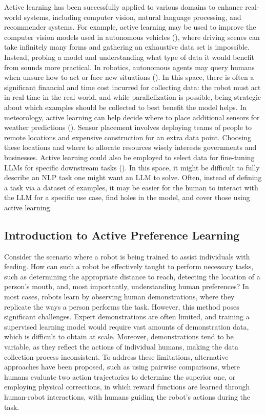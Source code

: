 \documentclass[
  letterpaper,
  numbers=noenddot,
  DIV=11,
  oneside]{scrreprt}
\theoremstyle{remark}
\begin{document}
Active learning has been successfully applied to various domains to
enhance real-world systems, including computer vision, natural language
processing, and recommender systems. For example, active learning may be
used to improve the computer vision models used in autonomous vehicles
(), where driving
scenes can take infinitely many forms and gathering an exhaustive data
set is impossible. Instead, probing a model and understanding what type
of data it would benefit from sounds more practical. In robotics,
autonomous agents may query humans when unsure how to act or face new
situations (). In this space, there is often a significant financial and time
cost incurred for collecting data: the robot must act in real-time in
the real world, and while parallelization is possible, being strategic
about which examples should be collected to best benefit the model
helps. In meteorology, active learning can help decide where to place
additional sensors for weather predictions
().
Sensor placement involves deploying teams of people to remote locations
and expensive construction for an extra data point. Choosing these
locations and where to allocate resources wisely interests governments
and businesses. Active learning could also be employed to select data
for fine-tuning LLMs for specific downstream tasks
(). In this space, it
might be difficult to fully describe an NLP task one might want an LLM
to solve. Often, instead of defining a task via a dataset of examples,
it may be easier for the human to interact with the LLM for a specific
use case, find holes in the model, and cover those using active
learning.

\subsection{Introduction to Active Preference
Learning}\label{introduction-to-active-preference-learning}

Consider the scenario where a robot is being trained to assist
individuals with feeding. How can such a robot be effectively taught to
perform necessary tasks, such as determining the appropriate distance to
reach, detecting the location of a person's mouth, and, most
importantly, understanding human preferences? In most cases, robots
learn by observing human demonstrations, where they replicate the ways a
person performs the task. However, this method poses significant
challenges. Expert demonstrations are often limited, and training a
supervised learning model would require vast amounts of demonstration
data, which is difficult to obtain at scale. Moreover, demonstrations
tend to be variable, as they reflect the actions of individual humans,
making the data collection process inconsistent. To address these
limitations, alternative approaches have been proposed, such as using
pairwise comparisons, where humans evaluate two action trajectories to
determine the superior one, or employing physical corrections, in which
reward functions are learned through human-robot interactions, with
humans guiding the robot's actions during the task.
\end{document}
